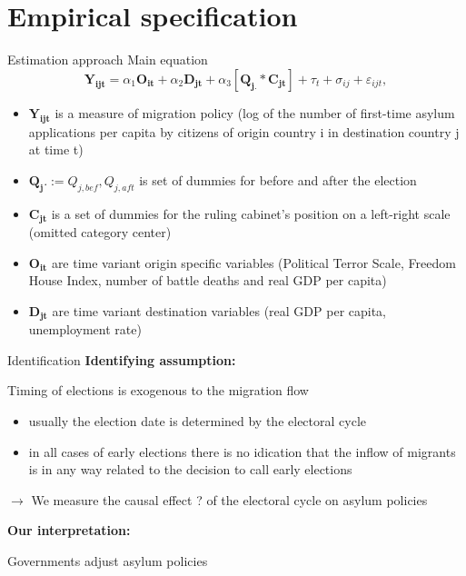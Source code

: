 \documentclass{beamer}
\begin{document}
\section{Empirical specification}
    \begin{frame}{Estimation approach}
Main equation
\begin{equation}
\mathbf{Y_{ijt}} =\alpha_1 \mathbf{O_{it}} + \alpha_2 \mathbf{D_{jt}} + \alpha_3 [\mathbf{Q_{j.}} *  \mathbf{C_{jt}}] + \tau_t + \sigma_{ij} +  \varepsilon_{ijt},
\end{equation}
\vspace{-2ex}
\begin{itemize}
\item $\mathbf{Y_{ijt}}$ is a measure of migration policy (log of the number of first-time asylum applications per capita by citizens of origin country i in destination country j at time t)
\item $\mathbf{Q_j.} := Q_{j,bef}, Q_{j,aft}$ is set of dummies for before and after the election
\item $\mathbf{C_{jt}}$ is a set of dummies for the ruling cabinet's position on a left-right scale (omitted category center)
\item $\mathbf{O_{it}}$ are time variant origin specific variables (Political Terror Scale, Freedom House Index, number of battle deaths and real GDP per capita) 
\item $\mathbf{D_{jt}}$  are time variant destination variables (real GDP per capita, unemployment rate)
\end{itemize}
    \end{frame}
    \begin{frame}{Identification}
\textbf{Identifying assumption:}
\vspace{.2cm}

Timing of elections is exogenous to the migration flow 
\vspace{.2cm}
\begin{itemize}
	\item usually the election date is determined by the electoral cycle
	\item in all cases of early elections there is no idication that the inflow of migrants is in any way related to the decision to call early elections 
\end{itemize}
\vspace{.2cm}
$\rightarrow$ We measure the causal effect ? of the electoral cycle on asylum policies 
\vspace{.4cm}

\textbf{Our interpretation:}
\vspace{.2cm}

Governments adjust asylum policies 
	\end{frame}
\end{document}
